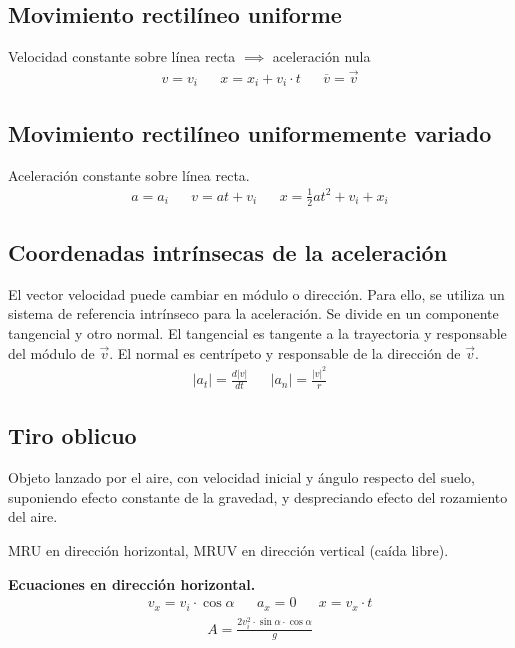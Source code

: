 \documentclass[12pt]{article}
\begin{document}
\subsection{Movimiento rectilíneo uniforme}

Velocidad constante sobre línea recta \(\implies\) aceleración nula
\begin{align*}
    v = v_{i} &  & x = x_{i} + v_{i} \cdot t &  & \overline{v} = \vec{v}
\end{align*}

\subsection{Movimiento rectilíneo uniformemente variado}

Aceleración constante sobre línea recta.
\begin{align*}
    a = a_{i} &  & v = at + v_{i} &  & x = \frac{1}{2}at^{2} + v_{i} + x_{i}
\end{align*}

\subsection{Coordenadas intrínsecas de la aceleración}

El vector velocidad puede cambiar en módulo o dirección.
Para ello, se utiliza un sistema de referencia intrínseco para la aceleración.
Se divide en un componente tangencial y otro normal.
El tangencial es tangente a la trayectoria y responsable del módulo de \(\vec{v}\).
El normal es centrípeto y responsable de la dirección de \(\vec{v}\).
\begin{align*}
    |a_{t}| = \frac{d|v|}{dt} &  & |a_{n}| = \frac{|v|^{2}}{r}
\end{align*}

\subsection{Tiro oblicuo}

Objeto lanzado por el aire,
con velocidad inicial y ángulo respecto del suelo,
suponiendo efecto constante de la gravedad,
y despreciando efecto del rozamiento del aire.

MRU en dirección horizontal,
MRUV en dirección vertical (caída libre).

\textbf{Ecuaciones en dirección horizontal.}
\begin{align*}
    v_{x} = v_{i}\cdot\cos \alpha &  & a_{x} = 0 &  & x = v_{x}\cdot t
\end{align*}
\begin{align*}
    A = \frac{2v_{i}^{2}\cdot\sin\alpha\cdot\cos\alpha}{g}
\end{align*}
\end{document}
